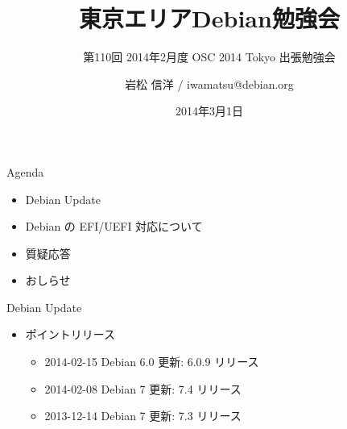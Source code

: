 \title{東京エリアDebian勉強会}
\subtitle{第110回 2014年2月度 OSC 2014 Tokyo 出張勉強会}
\author{岩松 信洋 / iwamatsu@debian.org}
\date{2014年3月1日}



\begin{frame}
\titlepage{}
\end{frame}

\begin{frame}{Agenda}
  \begin{itemize}
   \item Debian Update
   \item Debian の EFI/UEFI 対応について
   \item 質疑応答
   \item おしらせ
  \end{itemize}
\end{frame}
%
%

\begin{frame}{Debian Update}

\begin{itemize}
\item ポイントリリース
\begin{itemize}
\item 2014-02-15 Debian 6.0 更新: 6.0.9 リリース
\item 2014-02-08 Debian 7 更新: 7.4 リリース
\item 2013-12-14 Debian 7 更新: 7.3 リリース
\end{itemize}
\end{itemize}
\end{frame}

